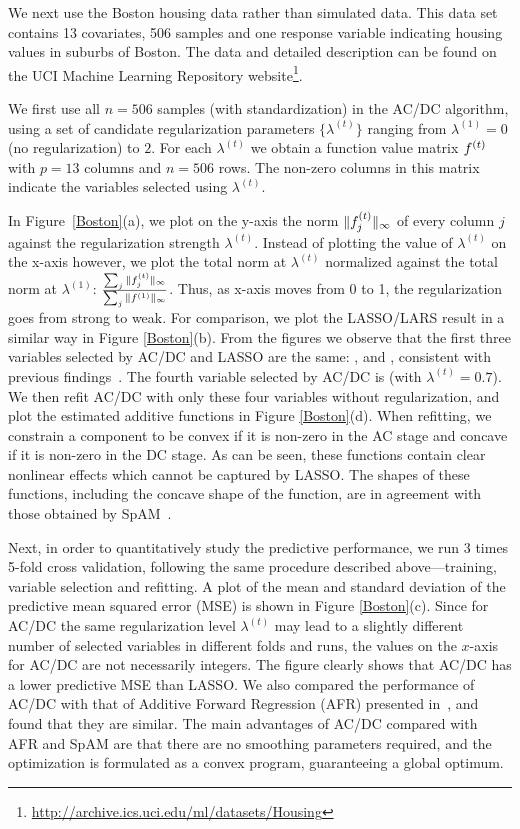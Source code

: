 We next use the Boston housing data rather than simulated data. This data set
contains 13 covariates, 506 samples and one response variable
indicating housing values in suburbs of Boston. The data and detailed description
can be found on the UCI Machine Learning Repository website\footnote{\url{http://archive.ics.uci.edu/ml/datasets/Housing}}. 

We first use all $n=506$ samples (with standardization) in the AC/DC algorithm,
using a set of candidate regularization parameters $\{\lambda^{(t)}\}$
ranging from $\lambda^{(1)} = 0$ (no regularization) to $2$. For each $\lambda^{(t)}$
we obtain a function value matrix $f^{(t)}$ with $p=13$
columns and $n=506$ rows. The non-zero columns in this matrix indicate the variables selected using $\lambda^{(t)}$.  

In Figure~\ref{Boston}(a), we plot on the y-axis the norm $\|f^{(t)}_j\|_{\infty}$ of every column $j$ against the regularization strength $\lambda^{(t)}$. Instead of plotting the value of $\lambda^{(t)}$ on the x-axis however, we plot the total norm at $\lambda^{(t)}$ normalized against the total norm at $\lambda^{(1)}$: $\frac{\sum_j \|f^{(t)}_j\|_{\infty}}{\sum_j \|f^{(1)}\|_{\infty}}$. Thus, as x-axis moves from 0 to 1, the regularization goes from strong to weak. For comparison, we
plot the LASSO/LARS result in a similar way in Figure \ref{Boston}(b).
From the figures we observe that the first three variables selected by
AC/DC and LASSO are the same: ,  and ,
consistent with previous findings~\citep{SpAM:07}.  The fourth
variable selected by AC/DC is  (with $\lambda^{(t)}=0.7$).
We then refit AC/DC with only these four variables without
regularization, and plot the estimated additive functions in Figure
\ref{Boston}(d). When refitting, we constrain a component to be convex if it is non-zero in the AC stage and concave if it is non-zero in the DC stage. As can be seen, these functions contain clear
nonlinear effects which cannot be captured by LASSO. The shapes of
these functions, including the concave shape of the  function, are in agreement with those obtained by
SpAM~\citep{SpAM:07}. 

Next, in order to quantitatively study the predictive performance, we
run 3 times 5-fold cross validation, following the same procedure
described above---training, variable selection and refitting.  A plot
of the mean and standard deviation of the predictive mean squared
error (MSE) is shown in Figure \ref{Boston}(c). Since for AC/DC the same
regularization level $\lambda^{(t)}$ may lead to a slightly different number of selected
variables in different folds and runs, the values on the $x$-axis
for AC/DC are not necessarily integers. The figure clearly shows that AC/DC has a 
lower predictive MSE than LASSO.  We also compared the performance of
AC/DC with that of Additive Forward Regression (AFR) presented
in~\cite{Xi:09}, and found that they are similar.  The main advantages
of AC/DC compared with AFR and SpAM are that there are no smoothing
parameters required, and the optimization is formulated
as a convex program, guaranteeing a global optimum.

